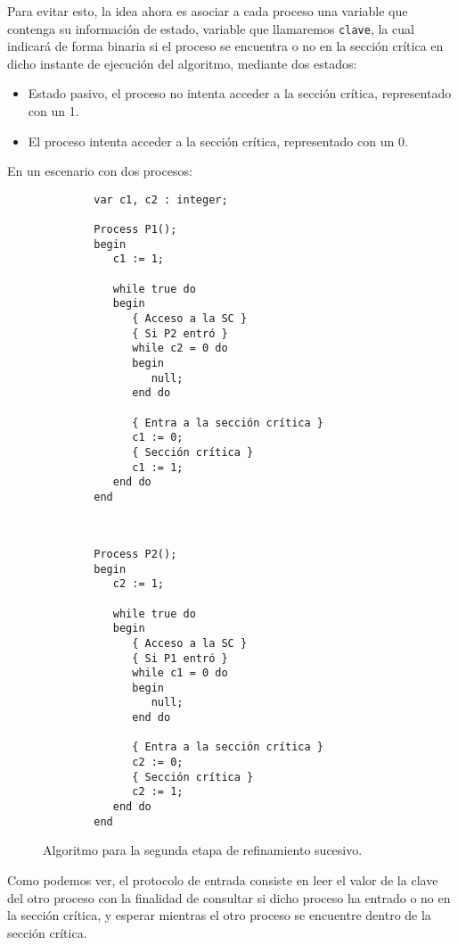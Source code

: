 Para evitar esto, la idea ahora es asociar a cada proceso una variable que contenga su información de estado, variable que llamaremos \verb|clave|, la cual indicará de forma binaria si el proceso se encuentra o no en la sección crítica en dicho instante de ejecución del algoritmo, mediante dos estados:
\begin{itemize}
    \item Estado pasivo, el proceso no intenta acceder a la sección crítica, representado con un 1.
    \item El proceso intenta acceder a la sección crítica, representado con un 0.
\end{itemize}
En un escenario con dos procesos:
\begin{figure}[H]
    \centering
\setlength{\columnsep}{1cm}
\begin{multicols}{2}
    \begin{verbatim}
        var c1, c2 : integer;
    
        Process P1();
        begin
           c1 := 1;
    
           while true do
           begin
              { Acceso a la SC }
              { Si P2 entró }
              while c2 = 0 do   
              begin
                 null;
              end do
    
              { Entra a la sección crítica }
              c1 := 0;
              { Sección crítica }
              c1 := 1;
           end do
        end
    \end{verbatim}
    \begin{verbatim}

    
        Process P2();
        begin
           c2 := 1;
    
           while true do
           begin
              { Acceso a la SC }
              { Si P1 entró }
              while c1 = 0 do
              begin
                 null;
              end do
    
              { Entra a la sección crítica }
              c2 := 0;
              { Sección crítica }
              c2 := 1;
           end do
        end
    \end{verbatim}
\end{multicols}
\caption{Algoritmo para la segunda etapa de refinamiento sucesivo.}
\end{figure}
Como podemos ver, el protocolo de entrada consiste en leer el valor de la clave del otro proceso con la finalidad de consultar si dicho proceso ha entrado o no en la sección crítica, y esperar mientras el otro proceso se encuentre dentro de la sección crítica.\\

